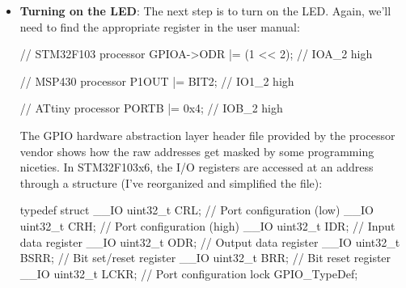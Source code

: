 \documentclass{report}
\begin{document}
\begin{itemize}
\begin{cppcode}
            // MSP430 processor
            P1DIR |= BIT2; // set IO1_2 to be an output

            // ATtiny processor
            DDRB |= 0x4; // set IOB_2 to be an output
            \end{cppcode}
            \bigbreak \noindent 
            Note that the register names are different for each processor, but the effect of the code in each line is the same. Each processor has different options for setting the second bit in the byte (or word).
            \bigbreak \noindent 
            In each of these examples, the code is reading the current register value, modifying it, and then writing the result back to the register. This read-modify-write cycle needs to happen in atomic chunks, meaning they need to execute without interruptions or any
            \bigbreak \noindent 
            other processing between steps. If you read the value, modify it, and then do some other stuff before writing the register, you run the risk that the register has changed and the value you are writing is out of date. The register modification will change the intended bit, but also might have unintended consequences.
        \item \textbf{Turning on the LED}: The next step is to turn on the LED. Again, we’ll need to find the appropriate register in the user manual:
            \bigbreak \noindent 
            \begin{cppcode}
                // STM32F103 processor
                GPIOA->ODR |= (1 << 2); // IOA_2 high

                // MSP430 processor
                P1OUT |= BIT2; // IO1_2 high

                // ATtiny processor
                PORTB |= 0x4; // IOB_2 high
            \end{cppcode}
            \bigbreak \noindent 
            The GPIO hardware abstraction layer header file provided by the processor vendor shows how the raw addresses get masked by some programming niceties. In STM32F103x6, the I/O registers are accessed at an address through a structure (I’ve reorganized and simplified the file):
            \bigbreak \noindent 
            \begin{cppcode}
                typedef struct
                {
                    __IO uint32_t CRL; // Port configuration (low)
                    __IO uint32_t CRH; // Port configuration (high)
                    __IO uint32_t IDR; // Input data register
                    __IO uint32_t ODR; // Output data register
                    __IO uint32_t BSRR; // Bit set/reset register
                    __IO uint32_t BRR; // Bit reset register
                    __IO uint32_t LCKR; // Port configuration lock
                } GPIO_TypeDef;


\end{cppcode}
\end{itemize}
\end{document}
